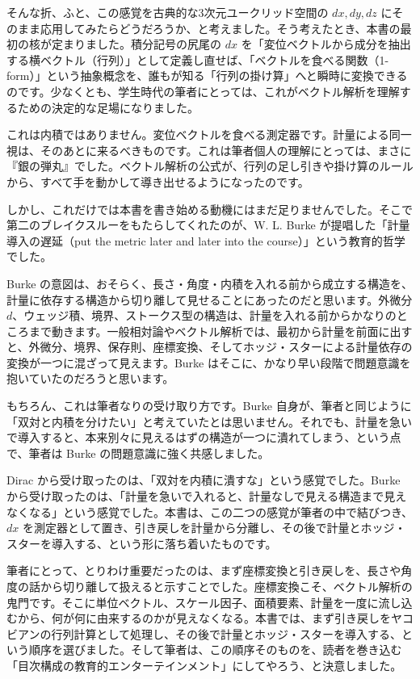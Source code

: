 \documentclass[a4paper,12pt,openany]{book}
\begin{document}
そんな折、ふと、この感覚を古典的な3次元ユークリッド空間の \(dx,dy,dz\)
にそのまま応用してみたらどうだろうか、と考えました。そう考えたとき、本書の最初の核が定まりました。積分記号の尻尾の
\(dx\)
を「変位ベクトルから成分を抽出する横ベクトル（行列）」として定義し直せば、「ベクトルを食べる関数（1-form）」という抽象概念を、誰もが知る「行列の掛け算」へと瞬時に変換できるのです。少なくとも、学生時代の筆者にとっては、これがベクトル解析を理解するための決定的な足場になりました。

これは内積ではありません。変位ベクトルを食べる測定器です。計量による同一視は、そのあとに来るべきものです。これは筆者個人の理解にとっては、まさに『銀の弾丸』でした。ベクトル解析の公式が、行列の足し引きや掛け算のルールから、すべて手を動かして導き出せるようになったのです。

しかし、これだけでは本書を書き始める動機にはまだ足りませんでした。そこで第二のブレイクスルーをもたらしてくれたのが、W.
L. Burke が提唱した「計量導入の遅延（put the metric later and later into
the course）」という教育的哲学でした。

Burke
の意図は、おそらく、長さ・角度・内積を入れる前から成立する構造を、計量に依存する構造から切り離して見せることにあったのだと思います。外微分
\(d\)、ウェッジ積、境界、ストークス型の構造は、計量を入れる前からかなりのところまで動きます。一般相対論やベクトル解析では、最初から計量を前面に出すと、外微分、境界、保存則、座標変換、そしてホッジ・スターによる計量依存の変換が一つに混ざって見えます。Burke
はそこに、かなり早い段階で問題意識を抱いていたのだろうと思います。

もちろん、これは筆者なりの受け取り方です。Burke
自身が、筆者と同じように「双対と内積を分けたい」と考えていたとは思いません。それでも、計量を急いで導入すると、本来別々に見えるはずの構造が一つに潰れてしまう、という点で、筆者は
Burke の問題意識に強く共感しました。

Dirac から受け取ったのは、「双対を内積に潰すな」という感覚でした。Burke
から受け取ったのは、「計量を急いで入れると、計量なしで見える構造まで見えなくなる」という感覚でした。本書は、この二つの感覚が筆者の中で結びつき、\(dx\)
を測定器として置き、引き戻しを計量から分離し、その後で計量とホッジ・スターを導入する、という形に落ち着いたものです。

筆者にとって、とりわけ重要だったのは、まず座標変換と引き戻しを、長さや角度の話から切り離して扱えると示すことでした。座標変換こそ、ベクトル解析の鬼門です。そこに単位ベクトル、スケール因子、面積要素、計量を一度に流し込むから、何が何に由来するのかが見えなくなる。本書では、まず引き戻しをヤコビアンの行列計算として処理し、その後で計量とホッジ・スターを導入する、という順序を選びました。そして筆者は、この順序そのものを、読者を巻き込む「目次構成の教育的エンターテインメント」にしてやろう、と決意しました。
\end{document}
